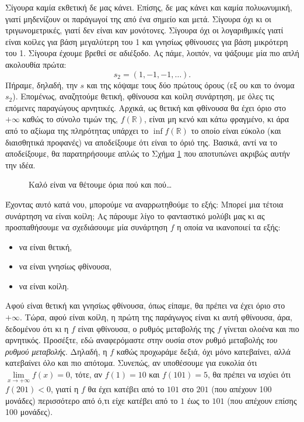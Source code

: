 \documentclass[11pt,a4paper]{article}
\newcommand{\R}{\mathbb{R}}
\theoremstyle{definition}
\begin{document}
	Σίγουρα καμία εκθετική δε μας κάνει. Επίσης, δε μας κάνει και καμία πολυωνυμική, γιατί μηδενίζουν οι παράγωγοί της από ένα σημείο και μετά. Σίγουρα όχι κι οι τριγωνομετρικές, γιατί δεν είναι καν μονότονες. Σίγουρα όχι οι λογαριθμικές γιατί είναι κοίλες για βάση μεγαλύτερη του 1 και γνησίως φθίνουσες για βάση μικρότερη του 1. Σίγουρα έχουμε βρεθεί σε αδιέξοδο. Ας πάμε, λοιπόν, να ψάξουμε μία πιο απλή ακολουθία πρώτα:
	\[s_2=(1,-1,-1,\ldots).\]
	Πήραμε, δηλαδή, την $s$ και της κόψαμε τους δύο πρώτους όρους (εξ ου και το όνομα $s_2$). Επομένως, αναζητούμε θετική, φθίνουσα και κοίλη συνάρτηση, με όλες τις επόμενες παραγώγους αρνητικές. Αρχικά, ως θετική και φθίνουσα θα έχει όριο στο $+\infty$ καθώς το σύνολο τιμών της, $f(\R)$, είναι μη κενό και κάτω φραγμένο, κι άρα από το αξίωμα της πληρότητας υπάρχει το $\inf f(\R)$ το οποίο είναι εύκολο (και διαισθητικά προφανές) να αποδείξουμε ότι είναι το όριό της. Βασικά, αντί να το αποδείξουμε, θα παρατηρήσουμε απλώς το Σχήμα \ref{fig:2} που αποτυπώνει ακριβώς αυτήν την ιδέα.
	
	\begin{figure}[!htb]
		\centering
		\caption{Καλό είναι να θέτουμε όρια πού και πού\ldots}
		\label{fig:2}
	\end{figure}

	Έχοντας αυτό κατά νου, μπορούμε να αναρρωτηθούμε το εξής: Μπορεί μια τέτοια συνάρτηση να είναι κοίλη; Ας πάρουμε λίγο το φανταστικό μολύβι μας κι ας προσπαθήσουμε να σχεδιάσουμε μία συνάρτηση $f$ η οποία να ικανοποιεί τα εξής:
	\begin{itemize}
		\item να είναι θετική,
		\item να είναι γνησίως φθίνουσα,
		\item να είναι κοίλη.
	\end{itemize}
	Αφού είναι θετική και γνησίως φθίνουσα, όπως είπαμε, θα πρέπει να έχει όριο στο $+\infty$. Τώρα, αφού είναι κοίλη, η πρώτη της παράγωγος είναι κι αυτή φθίνουσα, άρα, δεδομένου ότι κι η $f$ είναι φθίνουσα, ο ρυθμός μεταβολής της $f$ γίνεται ολοένα και πιο αρνητικός. Προσέξτε, εδώ αναφερόμαστε στην ουσία στον ρυθμό μεταβολής \textit{του ρυθμού μεταβολής}. Δηλαδή, η $f$ καθώς προχωράμε δεξιά, όχι μόνο κατεβαίνει, αλλά κατεβαίνει όλο και πιο απότομα. Συνεπώς, αν υποθέσουμε για ευκολία ότι $\lim\limits_{x\to+\infty}f(x)=0$, τότε, αν $f(1)=10$ και $f(101)=5$, θα πρέπει να ισχύει ότι $f(201)<0$, γιατί η $f$ θα έχει κατέβει από το $101$ στο $201$ (που απέχουν 100 μονάδες) περισσότερο από ό,τι είχε κατέβει από το $1$ έως το $101$ (που απέχουν επίσης 100 μονάδες).
	
\end{document}
